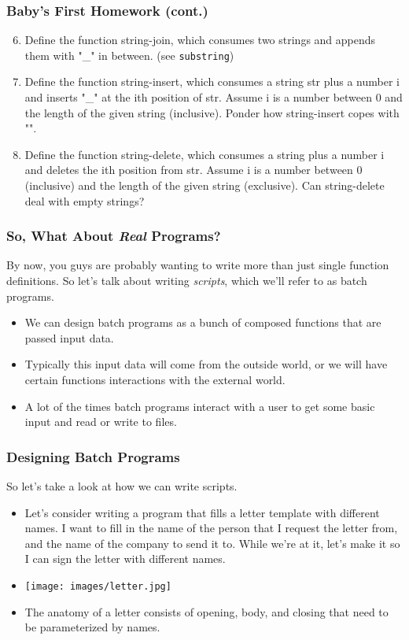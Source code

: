 \documentclass{beamer}
\begin{document}
\begin{frame}
  \frametitle{Baby's First Homework (cont.)}
  \begin{enumerate}
    \setcounter{enumi}{5}
 \item Define the function string-join, which consumes two strings and appends them with "\_" in between. (see \texttt{substring})
  \item Define the function string-insert, which consumes a string str plus a number i and inserts "\_" at the ith position of str. Assume i is a number between 0 and the length of the given string (inclusive). Ponder how string-insert copes with "".
  \item  Define the function string-delete, which consumes a string plus a number i and deletes the ith position from str. Assume i is a number between 0 (inclusive) and the length of the given string (exclusive). Can string-delete deal with empty strings? 
  \end{enumerate}
\end{frame}

\begin{frame}
  \frametitle{So, What About \emph{Real} Programs?}
  By now, you guys are probably wanting to write more than just single
  function definitions. So let's talk about writing \emph{scripts}, which
  we'll refer to as batch programs.
  \begin{itemize}
  \item<2-> We can design batch programs as a bunch of composed functions
    that are passed input data.
  \item<3-> Typically this input data will come from the outside world, or
    we will have certain functions interactions with the external world.
  \item<4-> A lot of the times batch programs interact with a user to get
    some basic input and read or write to files.
  \end{itemize}
\end{frame}

\begin{frame}
  \frametitle{Designing Batch Programs}
  So let's take a look at how we can write scripts.
  \begin{itemize}
  \item<2-> Let's consider writing a program that fills a letter template with different names. I want to fill in the name of the person that I request the letter
    from, and the name of the company to send it to. While we're at it, let's
    make it so I can sign the letter with different names.
  \item<3-> \texttt{[image: images/letter.jpg]}
  \item<4-> The anatomy of a letter consists of opening, body, and closing that
    need to be parameterized by names.  
  \end{itemize}
\end{frame}
\end{document}

